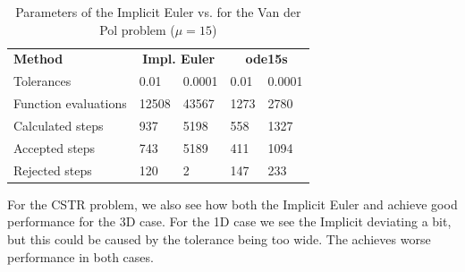 \begin{table}[H]
    \centering
    \begin{tabular}{@{}l|ll|ll@{}}
    \toprule
    \textbf{Method}      & \multicolumn{2}{c|}{\textbf{Impl. Euler}} & \multicolumn{2}{c}{\textbf{ode15s}} \\
    Tolerances           & 0.01                & 0.0001              & 0.01            & 0.0001            \\ \midrule
    Function evaluations & 12508               & 43567               & 1273            & 2780              \\
    Calculated steps     & 937                 & 5198                & 558             & 1327              \\
    Accepted steps       & 743                 & 5189                & 411             & 1094              \\
    Rejected steps       & 120                 & 2                   & 147             & 233               \\ \bottomrule
    \end{tabular}
    \caption{Parameters of the Implicit Euler vs.  for the Van der Pol problem ($\mathit{\mu = 15}$)}
    \label{3_6_adaptive_mu_15_table}
\end{table}

For the CSTR problem, we also see how both the Implicit Euler and  achieve good performance for the 3D case. For the 1D case we see the Implicit deviating a bit, but this could be caused by the tolerance being too wide. The  achieves worse performance in both cases.

